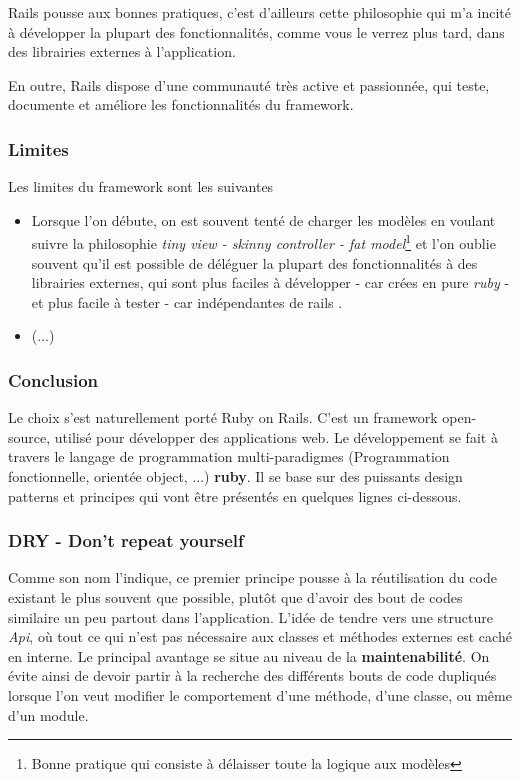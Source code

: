Rails pousse aux bonnes pratiques, c'est d'ailleurs cette philosophie qui m'a incité à développer la plupart des fonctionnalités, comme vous le verrez plus tard, dans des librairies externes à l'application.


En outre, Rails dispose d'une communauté très active et passionnée, qui teste, documente et améliore les fonctionnalités du framework. 
\subsubsection{Limites}
Les limites du framework sont les suivantes
\begin{itemize}
\item Lorsque l'on débute, on est souvent tenté de charger les modèles en voulant suivre la philosophie \textit{tiny view - skinny controller - fat model}\footnote{Bonne pratique qui consiste à délaisser toute la logique aux modèles} et l'on oublie souvent qu'il est possible de déléguer la plupart des fonctionnalités à des librairies externes, qui sont plus faciles à développer - car crées en pure \textit{ruby} - et plus facile à tester - car indépendantes de rails \cite{fat_models}.

\item (...)
\end{itemize}

\subsubsection{Conclusion}
Le choix s'est naturellement porté Ruby on Rails. C'est un framework open-source, utilisé pour développer des applications web. Le développement se fait à travers le langage de programmation multi-paradigmes (Programmation fonctionnelle, orientée object, ...) \textbf{ruby}. Il se base sur des puissants design patterns et principes qui vont être présentés en quelques lignes ci-dessous.

\subsubsection{DRY - Don't repeat yourself}
Comme son nom l'indique, ce premier principe pousse à la réutilisation du code existant le plus souvent que possible, plutôt que d'avoir des bout de codes similaire un peu partout dans l'application. L'idée de tendre vers une structure \textit{Api}, où tout ce qui n'est pas nécessaire aux classes et méthodes externes est caché en interne. Le principal avantage se situe au niveau de la \textbf{maintenabilité}. On évite ainsi de devoir partir à la recherche des différents bouts de code dupliqués lorsque l'on veut modifier le comportement d'une méthode, d'une classe, ou même d'un module.

